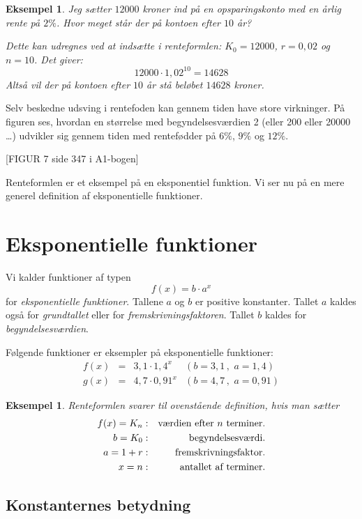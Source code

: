 \documentclass[12pt,oneside,a4paper]{article}
\newcommand{\bas}{\begin{eqnarray*}}
\newcommand{\eas}{\end{eqnarray*}}
\newtheorem{eks}[thm]{Eksempel}
\begin{document}
\begin{eks}
    Jeg sætter $12000$ kroner ind på en opsparingskonto med en årlig rente på
    $2\%$. Hvor meget står der på kontoen efter $10$ år?

    Dette kan udregnes ved at indsætte i renteformlen: $K_0 = 12000$, $r = 0,02$
    og $n = 10$. Det giver:
    $$
    12000 \cdot 1,02^{10} = 14628
    $$
    Altså vil der på kontoen efter $10$ år stå beløbet $14628$ kroner.
\end{eks}

Selv beskedne udsving i rentefoden kan gennem tiden have store virkninger. På
figuren ses, hvordan en størrelse med begyndelsesværdien 2 (eller 200 eller
20000 \ldots) udvikler sig gennem tiden med rentefødder på $6\%$, $9\%$ og
$12\%$.

[FIGUR 7 side 347 i A1-bogen]

Renteformlen er et eksempel på en eksponentiel funktion. Vi ser nu på en mere generel
definition af eksponentielle funktioner.

\section{Eksponentielle funktioner}
Vi kalder funktioner af typen
$$
f(x) = b\cdot a^x
$$
for {\em eksponentielle funktioner}. Tallene $a$ og $b$ er positive konstanter.
Tallet $a$ kaldes også for {\em grundtallet} eller for {\em
fremskrivningsfaktoren}. Tallet $b$ kaldes for {\em begyndelsesværdien}.

Følgende funktioner er 
eksempler på eksponentielle funktioner:
$$
\begin{array}{rcll}
    f(x) &=& 3,1 \cdot 1,4^x & (b=3,1\, , \,\, a=1,4) \\
    g(x) &=& 4,7 \cdot 0,91^x & (b=4,7\, , \,\, a=0,91) 
\end{array}
$$

\begin{eks}
    Renteformlen svarer til ovenstående definition, hvis man sætter
    \bas
    f(x) = K_n & : & \hbox{værdien efter $n$ terminer.} \\
       b = K_0 & : & \hbox{begyndelsesværdi.} \\
       a = 1+r & : & \hbox{fremskrivningsfaktor.} \\
       x = n   & : & \hbox{antallet af terminer.}
    \eas
\end{eks}

\subsection{Konstanternes betydning}
\end{document}
